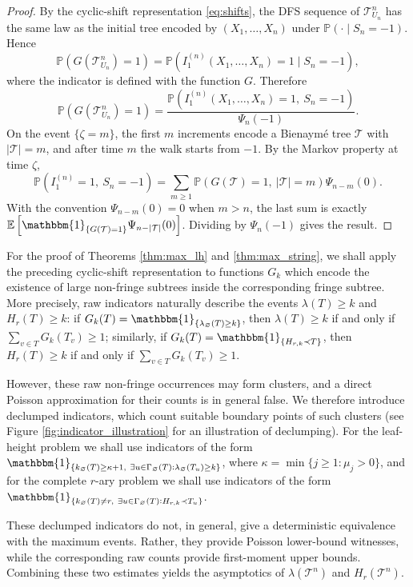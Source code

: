 \documentclass[a4paper,11pt]{article}
\newcommand{\E}{\mathbb{E}}
\DeclareRobustCommand{\P}{\mathbb{P}}
\DeclareRobustCommand{\1}{\mathbf{1}}
\begin{document}
\begin{proof}
By the cyclic-shift representation \eqref{eq:shifts}, the DFS sequence of
$\mathcal T^n_{U_n}$ has the same law as the initial tree encoded by
$(X_1,\ldots,X_n)$ under $\P(\cdot\mid S_n=-1)$. Hence
$$
\P(G(\mathcal T^n_{U_n})=1)
=
\P(I_1^{(n)}(X_1,\ldots,X_n)=1\mid S_n=-1),
$$
where the indicator is defined with the function $G$. Therefore
$$
\P(G(\mathcal T^n_{U_n})=1)
=
\frac{
\P(I_1^{(n)}(X_1,\ldots,X_n)=1,\ S_n=-1)
}{\Psi_n(-1)}.
$$
On the event $\{\zeta=m\}$, the first $m$ increments encode a Bienaym\'e tree
$\mathcal T$ with $|\mathcal T|=m$, and after time $m$ the walk starts from
$-1$. By the Markov property at time $\zeta$,
$$
\P(I_1^{(n)}=1,\ S_n=-1)
=
\sum_{m\ge1}
\P(G(\mathcal T)=1,\ |\mathcal T|=m)\Psi_{n-m}(0).
$$
With the convention $\Psi_{n-m}(0)=0$ when $m>n$, the last sum is exactly$
\E\left[
\mathbbm{1}_{\{G(\mathcal T)=1\}}
\Psi_{n-|\mathcal T|}(0)
\right]$.
Dividing by $\Psi_n(-1)$ gives the result.
\end{proof}

For the proof of Theorems \ref{thm:max_lh} and \ref{thm:max_string}, we shall apply the preceding cyclic-shift representation to functions $G_k$ which encode the existence of large non-fringe subtrees inside the corresponding fringe subtree. More precisely, raw indicators naturally describe the events $\lambda(T)\ge k$ and $H_r(T)\ge k$: if $G_k(T)=\mathbbm{1}_{\{\lambda_\varnothing(T)\ge k\}}$, then $\lambda(T)\ge k$ if and only if $\sum_{v\in T}G_k(T_v)\ge1$; similarly, if $G_k(T)=\mathbbm{1}_{\{H_{r,k}\prec T\}}$, then $H_r(T)\ge k$ if and only if $\sum_{v\in T}G_k(T_v)\ge1$.

However, these raw non-fringe occurrences may form clusters, and a direct Poisson approximation for their counts is in general false. We therefore introduce declumped indicators, which count suitable boundary points of such clusters (see Figure \ref{fig:indicator_illustration} for an illustration of  declumping). For the leaf-height problem we shall use indicators of the form
$\mathbbm{1}_{\{k_\varnothing(T)\ge\kappa+1,\ \exists u\in\Gamma_\varnothing(T):\lambda_\varnothing(T_u)\ge k\}}$, where $\kappa=\min\{j\ge1:\mu_j>0\}$, and for the complete $r$-ary problem we shall use indicators of the form
$\mathbbm{1}_{\{k_\varnothing(T)\neq r,\ \exists u\in\Gamma_\varnothing(T):H_{r,k}\prec T_u\}}$.

These declumped indicators do not, in general, give a deterministic equivalence with the maximum events. Rather, they provide Poisson lower-bound witnesses, while the corresponding raw counts provide first-moment upper bounds. Combining these two estimates yields the asymptotics of $\lambda(\mathcal T^n)$ and $H_r(\mathcal T^n)$.
\end{document}
